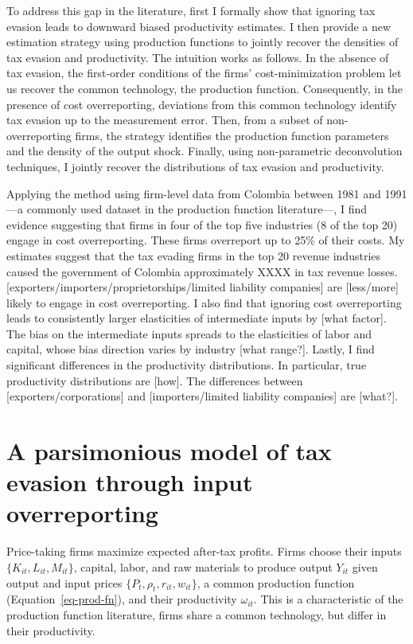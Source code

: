 \documentclass[
  12pt]{article}
\theoremstyle{definition}
\theoremstyle{remark}
\begin{document}
To address this gap in the literature, first I formally show that
ignoring tax evasion leads to downward biased productivity estimates. I
then provide a new estimation strategy using production functions to
jointly recover the densities of tax evasion and productivity. The
intuition works as follows. In the absence of tax evasion, the
first-order conditions of the firms' cost-minimization problem let us
recover the common technology, the production function. Consequently, in
the presence of cost overreporting, deviations from this common
technology identify tax evasion up to the measurement error. Then, from
a subset of non-overreporting firms, the strategy identifies the
production function parameters and the density of the output shock.
Finally, using non-parametric deconvolution techniques, I jointly
recover the distributions of tax evasion and productivity.

Applying the method using firm-level data from Colombia between 1981 and
1991 ---a commonly used dataset in the production function
literature---, I find evidence suggesting that firms in four of the top
five industries (8 of the top 20) engage in cost overreporting. These
firms overreport up to 25\% of their costs. My estimates suggest that
the tax evading firms in the top 20 revenue industries caused the
government of Colombia approximately XXXX in tax revenue losses.
{[}exporters/importers/proprietorships/limited liability companies{]}
are {[}less/more{]} likely to engage in cost overreporting. I also find
that ignoring cost overreporting leads to consistently larger
elasticities of intermediate inputs by {[}what factor{]}. The bias on
the intermediate inputs spreads to the elasticities of labor and
capital, whose bias direction varies by industry {[}what range?{]}.
Lastly, I find significant differences in the productivity
distributions. In particular, true productivity distributions are
{[}how{]}. The differences between {[}exporters/corporations{]} and
{[}importers/limited liability companies{]} are {[}what?{]}.

\section{A parsimonious model of tax evasion through input
overreporting}\label{a-parsimonious-model-of-tax-evasion-through-input-overreporting}

Price-taking firms maximize expected after-tax profits. Firms choose
their inputs \(\{K_{it},L_{it},M_{it}\}\), capital, labor, and raw
materials to produce output \(Y_{it}\) given output and input prices
\(\{P_{t}, \rho_t, r_{it}, w_{it}\}\), a common production function
(Equation~\ref{eq-prod-fn}), and their productivity \(\omega_{it}\).
This is a characteristic of the production function literature, firms
share a common technology, but differ in their productivity.
\end{document}
